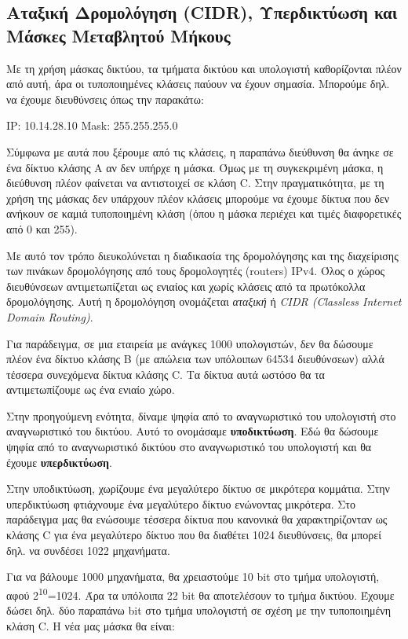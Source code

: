 %
%
\subsection{Αταξική Δρομολόγηση (CIDR), Υπερδικτύωση και Μάσκες Μεταβλητού Μήκους}

Με τη χρήση μάσκας δικτύου, τα τμήματα δικτύου και υπολογιστή καθορίζονται πλέον από αυτή, άρα οι τυποποιημένες κλάσεις παύουν να έχουν σημασία. Μπορούμε δηλ. να έχουμε διευθύνσεις όπως την παρακάτω:

IP: 10.14.28.10
Mask: 255.255.255.0

Σύμφωνα με αυτά που ξέρουμε από τις κλάσεις, η παραπάνω διεύθυνση θα άνηκε σε ένα δίκτυο κλάσης Α αν δεν υπήρχε η μάσκα. Όμως με τη συγκεκριμένη μάσκα, η διεύθυνση πλέον φαίνεται να αντιστοιχεί σε κλάση C. Στην πραγματικότητα, με τη χρήση της μάσκας δεν υπάρχουν πλέον κλάσεις μπορούμε να έχουμε δίκτυα που δεν ανήκουν σε καμιά τυποποιημένη κλάση (όπου η μάσκα περιέχει και τιμές διαφορετικές από 0 και 255).

Με αυτό τον τρόπο διευκολύνεται η διαδικασία της δρομολόγησης και της διαχείρισης των πινάκων δρομολόγησης από τους δρομολογητές (routers) IPv4.  Όλος ο χώρος διευθύνσεων αντιμετωπίζεται ως ενιαίος και χωρίς κλάσεις από τα πρωτόκολλα δρομολόγησης. Αυτή η δρομολόγηση ονομάζεται \emph{αταξική} ή \emph{CIDR (Classless Internet Domain Routing)}.

Για παράδειγμα, σε μια εταιρεία με ανάγκες 1000 υπολογιστών, δεν θα δώσουμε πλέον ένα δίκτυο κλάσης B (με απώλεια των υπόλοιπων 64534 διευθύνσεων) αλλά τέσσερα συνεχόμενα δίκτυα κλάσης C. Τα δίκτυα αυτά ωστόσο θα τα αντιμετωπίζουμε ως ένα ενιαίο χώρο.

\begin{inthebox}
Στην προηγούμενη ενότητα, δίναμε ψηφία από το αναγνωριστικό του υπολογιστή στο αναγνωριστικό του δικτύου. Αυτό το ονομάσαμε \textbf{υποδικτύωση}. Εδώ θα δώσουμε ψηφία από το αναγνωριστικό δικτύου στο αναγνωριστικό του υπολογιστή και θα έχουμε \textbf{υπερδικτύωση}.

Στην υποδικτύωση,  χωρίζουμε ένα μεγαλύτερο δίκτυο σε μικρότερα κομμάτια. Στην υπερδικτύωση φτιάχνουμε ένα μεγαλύτερο δίκτυο ενώνοντας μικρότερα. Στο παράδειγμα μας θα ενώσουμε τέσσερα δίκτυα που κανονικά θα χαρακτηρίζονταν ως κλάσης C για ένα μεγαλύτερο δίκτυο που θα διαθέτει 1024 διευθύνσεις, θα μπορεί δηλ. να συνδέσει 1022 μηχανήματα.\\
\end{inthebox}

Για να βάλουμε 1000 μηχανήματα, θα χρειαστούμε 10 bit στο τμήμα υπολογιστή, αφού 2\textsuperscript{10}=1024. Άρα τα υπόλοιπα 22 bit θα αποτελέσουν το τμήμα δικτύου. Έχουμε δώσει δηλ. δύο παραπάνω bit στο τμήμα υπολογιστή σε σχέση με την τυποποιημένη κλάση C. Η νέα μας μάσκα θα είναι:

